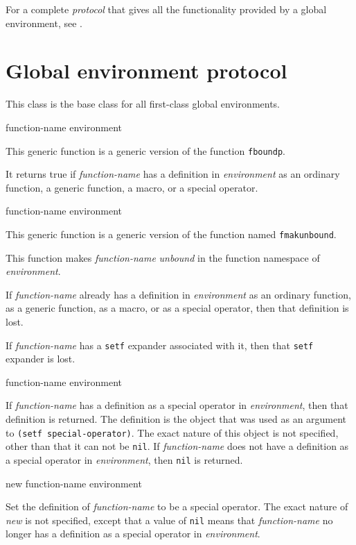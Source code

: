 For a complete \emph{protocol} that gives all the functionality
provided by a global environment, see
.

\section{Global environment protocol}
\label{sec-environments-global-environment-protocol}


This class is the base class for all first-class global environments.

 {function-name environment}

This generic function is a generic version of the \commonlisp{}
function \texttt{fboundp}.

It returns true if \textit{function-name} has a definition in
\textit{environment} as an ordinary function, a generic function, a
macro, or a special operator.

 {function-name environment}

This generic function is a generic version of the \commonlisp{}
function named \texttt{fmakunbound}.

This function makes \textit{function-name} \emph{unbound} in the
function namespace of \textit{environment}.

If \textit{function-name} already has a definition in
\textit{environment} as an ordinary function, as a generic function,
as a macro, or as a special operator, then that definition is lost.

If \textit{function-name} has a \texttt{setf} expander associated with
it, then that \texttt{setf} expander is lost.

 {function-name environment}

If \textit{function-name} has a definition as a special operator in
\textit{environment}, then that definition is returned.  The
definition is the object that was used as an argument to \texttt{(setf
  special-operator)}.  The exact nature of this object is not
specified, other than that it can not be \texttt{nil}.  If
\textit{function-name} does not have a definition as a special
operator in \textit{environment}, then \texttt{nil} is returned.

 {new function-name environment}

Set the definition of \textit{function-name} to be a special operator.
The exact nature of \textit{new} is not specified, except that a
value of \texttt{nil} means that \textit{function-name} no longer has
a definition as a special operator in \textit{environment}.

